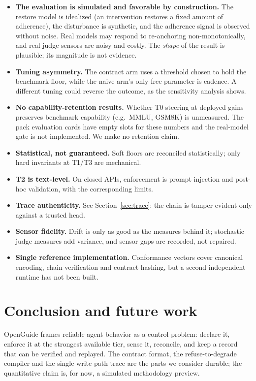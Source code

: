 \documentclass[11pt]{article}
\newcommand{\sys}{OpenGuide}
\begin{document}
\begin{itemize}[nosep,leftmargin=*]
\item \textbf{The evaluation is simulated and favorable by construction.} The
  restore model is idealized (an intervention restores a fixed amount of
  adherence), the disturbance is synthetic, and the adherence signal is observed
  without noise. Real models may respond to re-anchoring non-monotonically, and
  real judge sensors are noisy and costly. The \emph{shape} of the result is
  plausible; its magnitude is not evidence.
\item \textbf{Tuning asymmetry.} The contract arm uses a threshold chosen to hold
  the benchmark floor, while the naive arm's only free parameter is cadence. A
  different tuning could reverse the outcome, as the sensitivity analysis shows.
\item \textbf{No capability-retention results.} Whether T0 steering at deployed
  gains preserves benchmark capability (e.g.\ MMLU, GSM8K) is unmeasured. The pack
  evaluation cards have empty slots for these numbers and the real-model gate is
  not implemented. We make no retention claim.
\item \textbf{Statistical, not guaranteed.} Soft floors are reconciled
  statistically; only hard invariants at T1/T3 are mechanical.
\item \textbf{T2 is text-level.} On closed APIs, enforcement is prompt injection
  and post-hoc validation, with the corresponding limits.
\item \textbf{Trace authenticity.} See Section~\ref{sec:trace}: the chain is
  tamper-evident only against a trusted head.
\item \textbf{Sensor fidelity.} Drift is only as good as the measures behind it;
  stochastic judge measures add variance, and sensor gaps are recorded, not
  repaired.
\item \textbf{Single reference implementation.} Conformance vectors cover
  canonical encoding, chain verification and contract hashing, but a second
  independent runtime has not been built.
\end{itemize}

\section{Conclusion and future work}
\label{sec:conclusion}

\sys{} frames reliable agent behavior as a control problem: declare it, enforce it
at the strongest available tier, sense it, reconcile, and keep a record that can
be verified and replayed. The contract format, the refuse-to-degrade compiler and
the single-write-path trace are the parts we consider durable; the quantitative
claim is, for now, a simulated methodology preview.
\end{document}
